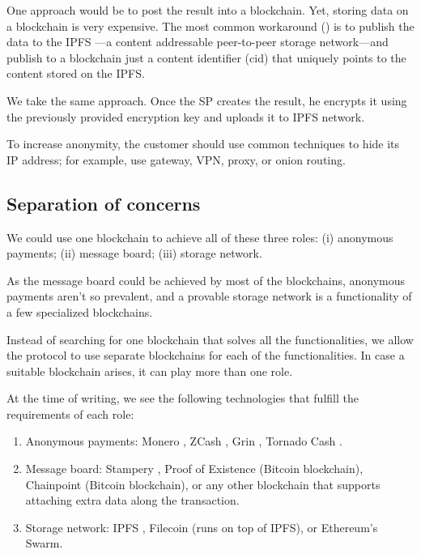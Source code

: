 \documentclass{ieeeaccess}
\begin{document}
One approach would be to post the result into a blockchain. Yet, storing data on a blockchain is very expensive. The most common workaround (\cite{shahid2020blockchain, wang2019auditable, chen2017improved, Usageide95}) is to publish the data to the IPFS \cite{benet2014ipfs}—a content addressable peer-to-peer storage network—and publish to a blockchain just a content identifier (cid) that uniquely points to the content stored on the IPFS.

We take the same approach. Once the SP creates the result, he encrypts it using the previously provided encryption key and uploads it to IPFS network.

To increase anonymity, the customer should use common techniques to hide its IP address; for example, use gateway, VPN, proxy, or onion routing.

\subsection{Separation of concerns}
We could use one blockchain to achieve all of these three roles: (i) anonymous payments; (ii) message board; (iii) storage network.

As the message board could be achieved by most of the blockchains, anonymous payments aren't so prevalent, and a provable storage network is a functionality of a few specialized blockchains.

Instead of searching for one blockchain that solves all the functionalities, we allow the protocol to use separate blockchains for each of the functionalities. In case a suitable blockchain arises, it can play more than one role.

At the time of writing, we see the following technologies that fulfill the requirements of each role:

\begin{enumerate}
\def\labelenumi{\arabic{enumi}.}

\item Anonymous payments: Monero \cite{van2013cryptonote}, ZCash
  \cite{sasson2014zerocash}, Grin \cite{fuchsbauer2019aggregate},
  Tornado Cash \cite{pertsev2019tornado}.
\item Message board: Stampery \cite{de2016stampery}, Proof of Existence
  \cite{proofofexistence} (Bitcoin blockchain), Chainpoint
  \cite{Chainpoi39} (Bitcoin blockchain), or any other blockchain that
  supports attaching extra data along the transaction.
\item Storage network: IPFS \cite{benet2014ipfs}, Filecoin
  \cite{benetfilecoin} (runs on top of IPFS), or Ethereum's
  Swarm\cite{swarmwhi49}.
\end{enumerate}
\end{document}
